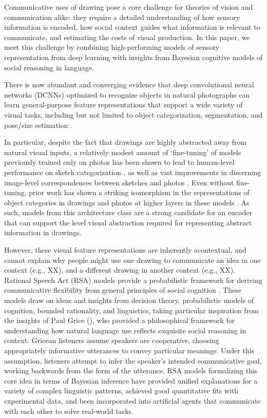 \documentclass[manuscript]{stjour}
\begin{document}
Communicative uses of drawing pose a core challenge for theories of vision and communication alike: they require a detailed understanding of how sensory information is encoded, how social context guides what information is relevant to communicate, and estimating the costs of visual production. In this paper, we meet this challenge by combining high-performing models of sensory representation from deep learning with insights from Bayesian cognitive models of social reasoning in language. 

There is now abundant and converging evidence that deep convolutional neural networks (DCNNs) optimized to recognize objects in natural photographs can learn general-purpose feature representations that support a wide variety of visual tasks, including but not limited to object categorization, segmentation, and pose/size estimation \cite[]{hong2016explicit,he2017mask}.

In particular, despite the fact that drawings are highly abstracted away from natural visual inputs, a relatively modest amount of `fine-tuning' of models previously trained only on photos has been shown to lead to human-level performance on sketch categorization \cite[]{yu2015sketch}, as well as vast improvements in discerning image-level correspondences between sketches and photos \cite[]{sangkloy2016sketchy}. Even without fine-tuning, prior work has shown a striking isomorphism in the representations of object categories in drawings and photos at higher layers in these models \cite[]{fan2015common}. As such, models from this architecture class are a strong candidate for an encoder that can support the level visual abstraction required for representing abstract information in drawings.

However, these visual feature representations are inherently acontextual, and cannot explain why people might use one drawing to communicate an idea in one context (e.g., XX), and a different drawing in another context (e.g., XX). Rational Speech Act (RSA) models provide a probabilistic framework for deriving communicative flexibility from general principles of social cognition \cite{GoodmanFrank16_RSATiCS}. These models draw on ideas and insights from decision theory, probabilistic models of cognition, bounded rationality, and linguistics, taking particular inspiration from the insights of Paul Grice (\citeyear{Grice75_LogicConversation}), who provided a philosophical framework for understanding how natural language use reflects exquisite social reasoning in context. Gricean listeners assume speakers are cooperative, choosing appropriately informative utterances to convey particular meanings. Under this assumption, listeners attempt to infer the speaker's intended communicative goal, working backwards from the form of the utterance. RSA models formalizing this core idea in terms of Bayesian inference have provided unified explanations for a variety of complex linguistic patterns, achieved good quantitative fits with experimental data, and been incorporated into artificial agents that communicate with each other to solve real-world tasks.
\end{document}
